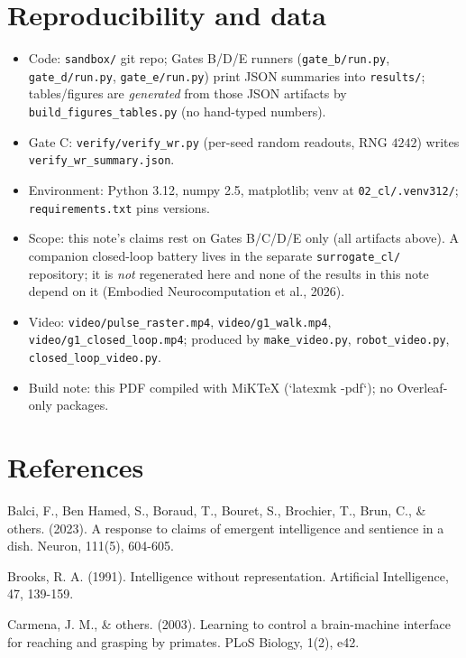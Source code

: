 \documentclass[12pt]{article}
\begin{document}
\section{Reproducibility and data}\label{sec:repro}
\begin{itemize}[nosep]
\item Code: \texttt{sandbox/} git repo; Gates B/D/E runners
(\texttt{gate\_b/run.py}, \texttt{gate\_d/run.py}, \texttt{gate\_e/run.py})
print JSON summaries into \texttt{results/}; tables/figures are
\emph{generated} from those JSON artifacts by
\texttt{build\_figures\_tables.py} (no hand-typed numbers).
\item Gate C: \texttt{verify/verify\_wr.py} (per-seed random readouts,
RNG $4242$) writes \texttt{verify\_wr\_summary.json}.
\item Environment: Python \SI{3.12}{}, numpy \SI{2.5}{},
matplotlib; venv at \texttt{02\_cl/.venv312/}; \texttt{requirements.txt}
pins versions.
\item Scope: this note's claims rest on Gates B/C/D/E only (all
artifacts above). A companion closed-loop battery lives in the separate
\texttt{surrogate\_cl/} repository; it is \emph{not} regenerated here
and none of the results in this note depend on it (Embodied Neurocomputation et al., 2026).
\item Video: \texttt{video/pulse\_raster.mp4}, \texttt{video/g1\_walk.mp4},
\texttt{video/g1\_closed\_loop.mp4}; produced by \texttt{make\_video.py},
\texttt{robot\_video.py}, \texttt{closed\_loop\_video.py}.
\item Build note: this PDF compiled with MiKTeX (`latexmk -pdf`); no
Overleaf-only packages.
\end{itemize}

\section*{References}

\noindent Balci, F., Ben Hamed, S., Boraud, T., Bouret, S., Brochier, T., Brun, C., \& others. (2023). A response to claims of emergent intelligence and sentience in a dish. Neuron, 111(5), 604-605.
\par

\noindent Brooks, R. A. (1991). Intelligence without representation. Artificial Intelligence, 47, 139-159.
\par

\noindent Carmena, J. M., \& others. (2003). Learning to control a brain-machine interface for reaching and grasping by primates. PLoS Biology, 1(2), e42.
\par
\end{document}
